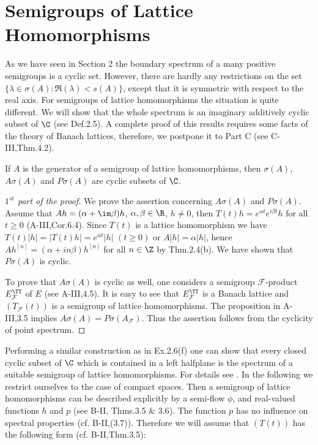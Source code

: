 \section{Semigroups of Lattice Homomorphisms}
As we have seen in Section 2 the boundary spectrum of a many positive semigroups is a cyclic set.
However, there are hardly any restrictions on the set $\{\lambda \in \sigma(A) : \Re(\lambda) < s(A)\}$, except that it is symmetric with respect to the real axis.
For semigroups of lattice homomorphisms the situation is quite different.
We will show that the whole spectrum is an imaginary additively cyclic subset of $\C$ (see Def.2.5).
A complete proof of this results requires some facts of the theory of Banach lattices, therefore, we postpone it to Part C (see C-III,Thm.4.2).
\begin{theorem}\label{thm:b3-4.1}
	If $A$ is the generator of a semigroup of lattice homomorphisms, then $\sigma(A)$, $A\sigma(A)$ and $P\sigma(A)$ are cyclic subsets of $\C$.
\end{theorem}
\begin{proof}[$1^{st}$ part of the proof]
	We prove the assertion concerning $A\sigma(A)$ and $P\sigma(A)$.
	Assume that $Ah = (\alpha + \im\beta)h$, $\alpha,\beta \in \R$, $h \neq 0$, then $T(t)h = e^{\alpha t}e^{i\beta t}h$ for all $t \geq 0$ (A-III,Cor.6.4).
	Since $T(t)$ is a lattice homomorphism we have $T(t)|h| = |T(t)h| = e^{\alpha t}|h|$ $(t \geq 0)$ or $A|h| = \alpha|h|$, hence $Ah^{[n]} = (\alpha + in\beta)h^{[n]}$ for all $n \in \Z$ by Thm.2.4(b).
	We have shown that $P\sigma(A)$ is cyclic.
	
	To prove that $A\sigma(A)$ is cyclic as well, one considers a semigroup $\mathcal{F}$-product $E_{\mathcal{F}}^{\TT}$ of $E$ (see A-III,4.5).
	It is easy to see that $E_{\mathcal{F}}^{\TT}$ is a Banach lattice 
	and $(T_{\mathcal{F}}(t))$ is a semigroup of lattice homomorphisms.
	The proposition in A-III,3.5 implies $A\sigma(A) = P\sigma(A_{\mathcal{F}})$.
	Thus the assertion follows from the cyclicity of point spectrum.
\end{proof}
Performing a similar construction as in Ex.2.6(f) one can show that every closed cyclic subset of $\C$  which is contained in a left half­plane is the spectrum of a suitable semigroup of lattice homomor­phisms. 
For details see \citet{derndingernagel:1979}. 
In the following we restrict ourselves to the case of compact spaces. 
Then a semigroup of lattice homomorphisms can be described explicitly by a semi-flow $\phi$, and real-valued functions $h$ and $p$ (see B-II, Thms.3.5 \& 3.6). The function $p$ has no influence on spectral proper­ties (cf. B-II,(3.7)). Therefore we will assume that $(T(t))$ has the following form (cf. B-II,Thm.3.5): 

